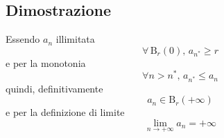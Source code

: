 \documentclass[../../dimostrazioni]{subfiles}
\begin{document}
        \subsection*{Dimostrazione}
            Essendo \(a_n\) illimitata 
            \[\forall \, \mathrm{B}_r(0), \, a_{n^*} \geqslant r \]
            e per la monotonia
            \[\forall n > n^*, \, a_{n^*} \leqslant a_n\]
            quindi, definitivamente
            \[a_n \in \mathrm{B}_r(+\infty)\]
            e per la definizione di limite 
            \[\lim_{n \to +\infty} a_n = +\infty\]
\end{document}
